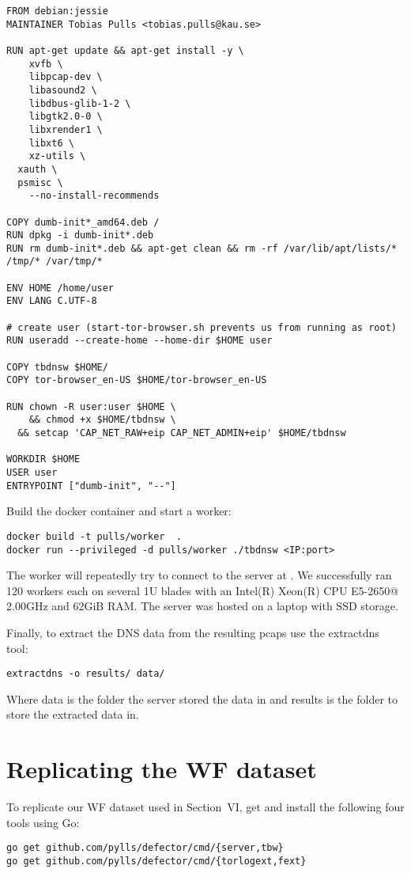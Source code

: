 \documentclass{article}
\begin{document}
\begin{lstlisting}
FROM debian:jessie
MAINTAINER Tobias Pulls <tobias.pulls@kau.se>

RUN apt-get update && apt-get install -y \
	xvfb \
	libpcap-dev \
	libasound2 \
	libdbus-glib-1-2 \
	libgtk2.0-0 \
	libxrender1 \
	libxt6 \
	xz-utils \
  xauth \
  psmisc \
	--no-install-recommends

COPY dumb-init*_amd64.deb /
RUN dpkg -i dumb-init*.deb
RUN rm dumb-init*.deb && apt-get clean && rm -rf /var/lib/apt/lists/* /tmp/* /var/tmp/*

ENV HOME /home/user
ENV LANG C.UTF-8

# create user (start-tor-browser.sh prevents us from running as root)
RUN useradd --create-home --home-dir $HOME user

COPY tbdnsw $HOME/
COPY tor-browser_en-US $HOME/tor-browser_en-US

RUN chown -R user:user $HOME \
	&& chmod +x $HOME/tbdnsw \
  && setcap 'CAP_NET_RAW+eip CAP_NET_ADMIN+eip' $HOME/tbdnsw

WORKDIR $HOME
USER user
ENTRYPOINT ["dumb-init", "--"]
\end{lstlisting}

Build the docker container and start a worker:

\begin{lstlisting}
docker build -t pulls/worker  .
docker run --privileged -d pulls/worker ./tbdnsw <IP:port>
\end{lstlisting}
The worker will repeatedly try to connect to the server at {\tt <IP:port>}. We
successfully ran 120 workers each on several 1U blades with an Intel(R) Xeon(R)
CPU E5-2650@ 2.00GHz and 62GiB RAM.
The server was hosted on a laptop with SSD storage.

Finally, to extract the DNS data from the resulting pcaps use the
extractdns tool:

\begin{lstlisting}
extractdns -o results/ data/
\end{lstlisting}
Where data is the folder the server stored the data in and results is the folder
to store the extracted data in.

\section{Replicating the WF dataset}
To replicate our WF dataset used in Section~VI, get and install the following
four tools using Go:
\begin{lstlisting}
go get github.com/pylls/defector/cmd/{server,tbw}
go get github.com/pylls/defector/cmd/{torlogext,fext}
\end{lstlisting}
\end{document}
